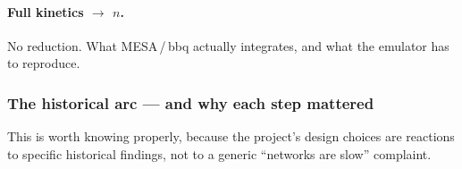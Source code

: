 \paragraph{Full kinetics $\to$ $n$.} No reduction. What MESA\,/\,bbq actually
integrates, and what the emulator has to reproduce.

\subsubsection{The historical arc --- and why each step mattered}
\label{sec:history}

This is worth knowing properly, because the project's design choices are
reactions to specific historical findings, not to a generic ``networks are
slow'' complaint.

